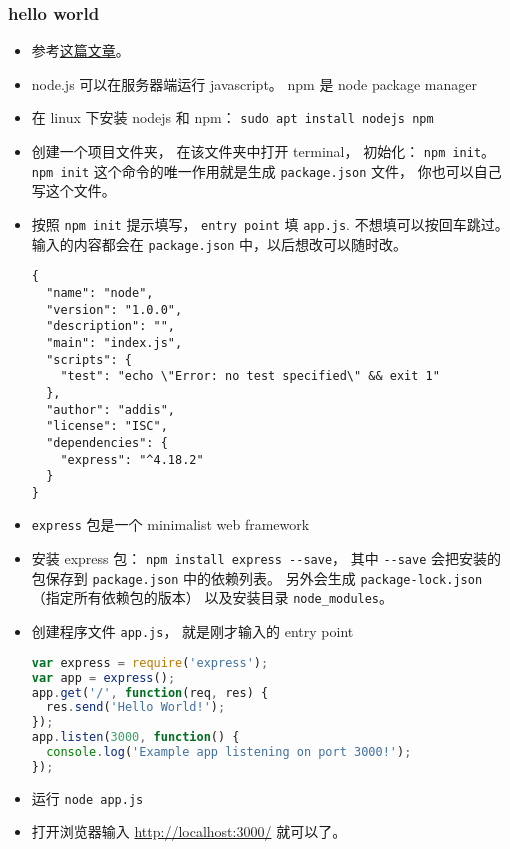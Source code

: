 
\begin{issues}
\issueDraft
\end{issues}


\subsubsection{hello world}
\begin{itemize}
\item 参考\href{https://medium.com/@adnanrahic/hello-world-app-with-node-js-and-express-c1eb7cfa8a30}{这篇文章}。
\item node.js 可以在服务器端运行 javascript。 npm 是 node package manager
\item 在 linux 下安装 nodejs 和 npm： \verb|sudo apt install nodejs npm|
\item 创建一个项目文件夹， 在该文件夹中打开 terminal， 初始化： \verb|npm init|。 \verb|npm init| 这个命令的唯一作用就是生成 \verb`package.json` 文件， 你也可以自己写这个文件。
\item 按照 \verb|npm init| 提示填写， \verb|entry point| 填 \verb`app.js`. 不想填可以按回车跳过。 输入的内容都会在 \verb|package.json| 中，以后想改可以随时改。
\begin{lstlisting}[language=none,caption=package.json 示例]
{
  "name": "node",
  "version": "1.0.0",
  "description": "",
  "main": "index.js",
  "scripts": {
    "test": "echo \"Error: no test specified\" && exit 1"
  },
  "author": "addis",
  "license": "ISC",
  "dependencies": {
    "express": "^4.18.2"
  }
}
\end{lstlisting}
\item \verb|express| 包是一个 minimalist web framework
\item 安装 express 包： \verb|npm install express --save|， 其中 \verb|--save| 会把安装的包保存到 \verb|package.json| 中的依赖列表。 另外会生成 \verb|package-lock.json| （指定所有依赖包的版本） 以及安装目录 \verb|node_modules|。
\item 创建程序文件 \verb|app.js|， 就是刚才输入的 entry point
\begin{lstlisting}[language=js]
var express = require('express');
var app = express();
app.get('/', function(req, res) {
  res.send('Hello World!');
});
app.listen(3000, function() {
  console.log('Example app listening on port 3000!');
});
\end{lstlisting}
\item 运行 \verb|node app.js|
\item 打开浏览器输入 \href{http://localhost:3000/}{http://localhost:3000/} 就可以了。
\end{itemize}
